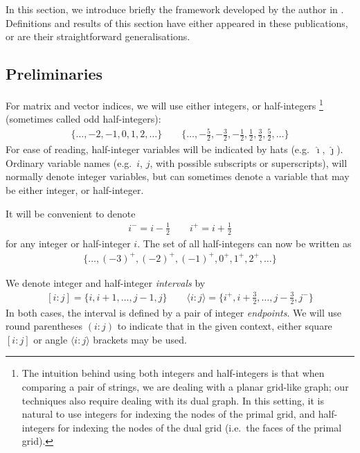 \documentclass[a4paper,UKenglish,cleveref]{lipics-v2021}
\newcommand{\tHalf}[1][1]{\tfrac{#1}{2}}
\newcommand{\A}{\hat}
\newcommand{\bra}[1]{[#1]}
\newcommand{\brc}[1]{\{#1\}}
\newcommand{\bigbrc}[1]{\bigl\{#1\bigr\}}
\newcommand{\ang}[1]{\langle#1\rangle}
\begin{document}
In this section, we introduce briefly the framework developed by the author 
in \cite{Tiskin:08_MCS,Tiskin:08_JDA,Tiskin:09_JMS,Tiskin:15_Algorithmica}.
Definitions and results of this section have either appeared in these publications,
or are their straightforward generalisations.

\subsection{Preliminaries}

For matrix and vector indices, we will use either integers, or half-integers%
\footnote{The intuition behind using both integers and half-integers
is that when comparing a pair of strings, 
we are dealing with a planar grid-like graph;
our techniques also require dealing with its dual graph.
In this setting, it is natural to use integers for indexing the nodes of the primal grid,
and half-integers for indexing the nodes of the dual grid (i.e.\ the faces of the primal grid).}
(sometimes called odd half-integers):
%
\begin{gather*}
%
\brc{\ldots, -2, -1, 0, 1, 2, \ldots}\qquad
\bigbrc{\ldots, -\tHalf[5], -\tHalf[3], -\tHalf[1], 
 \tHalf[1], \tHalf[3], \tHalf[5], \ldots}
%
\end{gather*}
%
For ease of reading, half-integer variables will be indicated by hats
(e.g.\ $\A\imath$, $\A\jmath$).
Ordinary variable names 
(e.g.\ $i$, $j$, with possible subscripts or superscripts), 
will normally denote integer variables,
but can sometimes denote a variable 
that may be either integer, or half-integer.

It will be convenient to denote
%
\begin{gather*}
%
i^- = i-\tHalf \qquad i^+ = i+\tHalf
%
\end{gather*}
%
for any integer or half-integer $i$.
The set of all half-integers can now be written as
%
\begin{gather*}
%
\bigbrc{\ldots, (-3)^+, (-2)^+, (-1)^+, 0^+, 1^+, 2^+, \ldots}
%
\end{gather*}

%
We denote integer and half-integer \emph{intervals} by
%
\begin{gather*}
%
\bra{i:j} = \brc{i, i+1, \ldots, j-1, j} \qquad
\ang{i:j} = \bigbrc{i^+, i+\tHalf[3], \ldots, j-\tHalf[3], j^-}
%
\end{gather*}
%
In both cases, the interval is defined by a pair of integer \emph{endpoints}.
We will use round parentheses $(i:j)$ to indicate that in the given context,
either square $\bra{i:j}$ or angle $\ang{i:j}$ brackets may be used.
\end{document}

